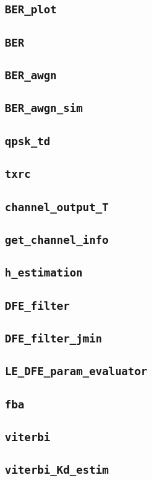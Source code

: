 \documentclass[10pt]{article}
\numberwithin{equation}{section}
\begin{document}
\subsection*{\texttt{BER\_plot}}

\subsection*{\texttt{BER}}
 \pagebreak
\subsection*{\texttt{BER\_awgn}}

\subsection*{\texttt{BER\_awgn\_sim}}
 \pagebreak

\subsection*{\texttt{qpsk\_td}}

\subsection*{\texttt{txrc}}

\subsection*{\texttt{channel\_output\_T}}

\subsection*{\texttt{get\_channel\_info}}

\subsection*{\texttt{h\_estimation}}

\subsection*{\texttt{DFE\_filter}}

\subsection*{\texttt{DFE\_filter\_jmin}}

\subsection*{\texttt{LE\_DFE\_param\_evaluator}}

\subsection*{\texttt{fba}}

\subsection*{\texttt{viterbi}}
 \pagebreak
\subsection*{\texttt{viterbi\_Kd\_estim}}

\end{document}
